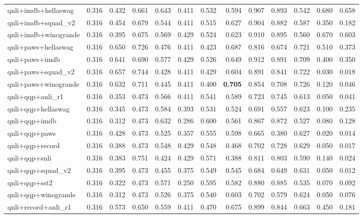 \begin{table}[t]
\begin{tabular}{lrrrrrrrrrrrr}
    qnli+imdb+hellaswag & 0.316 & 0.432 & 0.661 & 0.643 & 0.411 & 0.532 & 0.594 & 0.907 & 0.893 & 0.542 & 0.680 & 0.658 \\
    qnli+imdb+squad\_v2 & 0.316 & 0.454 & 0.679 & 0.544 & 0.411 & 0.515 & 0.627 & 0.904 & 0.882 & 0.587 & 0.350 & 0.182 \\
    qnli+imdb+winogrande & 0.316 & 0.395 & 0.675 & 0.569 & 0.429 & 0.524 & 0.623 & 0.910 & 0.895 & 0.560 & 0.670 & 0.603 \\
    qnli+paws+hellaswag & 0.316 & 0.650 & 0.726 & 0.476 & 0.411 & 0.423 & 0.687 & 0.816 & 0.674 & 0.721 & 0.510 & 0.373 \\
    qnli+paws+imdb & 0.316 & 0.641 & 0.690 & 0.577 & 0.429 & 0.526 & 0.649 & 0.912 & 0.891 & 0.709 & 0.400 & 0.350 \\
    qnli+paws+squad\_v2 & 0.316 & 0.657 & 0.744 & 0.428 & 0.411 & 0.429 & 0.604 & 0.891 & 0.841 & 0.722 & 0.030 & 0.018 \\
    qnli+paws+winogrande & 0.316 & 0.632 & 0.711 & 0.445 & 0.411 & 0.400 & \textbf{0.705} & 0.854 & 0.708 & 0.726 & 0.120 & 0.046 \\
    qnli+qqp+anli\_r1 & 0.316 & 0.353 & 0.473 & 0.566 & 0.411 & 0.541 & 0.589 & 0.723 & 0.745 & 0.613 & 0.050 & 0.041 \\
    qnli+qqp+hellaswag & 0.316 & 0.345 & 0.473 & 0.584 & 0.393 & 0.531 & 0.524 & 0.691 & 0.557 & 0.623 & 0.100 & 0.235 \\
    qnli+qqp+imdb & 0.316 & 0.312 & 0.473 & 0.632 & 0.286 & 0.600 & 0.561 & 0.867 & 0.872 & 0.527 & 0.080 & 0.128 \\
    qnli+qqp+paws & 0.316 & 0.428 & 0.473 & 0.525 & 0.357 & 0.555 & 0.598 & 0.665 & 0.380 & 0.627 & 0.020 & 0.014 \\
    qnli+qqp+record & 0.316 & 0.388 & 0.473 & 0.548 & 0.429 & 0.548 & 0.468 & 0.702 & 0.728 & 0.629 & 0.050 & 0.017 \\
    qnli+qqp+snli & 0.316 & 0.383 & 0.751 & 0.424 & 0.429 & 0.571 & 0.388 & 0.811 & 0.803 & 0.590 & 0.140 & 0.024 \\
    qnli+qqp+squad\_v2 & 0.316 & 0.395 & 0.473 & 0.455 & 0.375 & 0.549 & 0.545 & 0.684 & 0.649 & 0.631 & 0.050 & 0.012 \\
    qnli+qqp+sst2 & 0.316 & 0.322 & 0.473 & 0.571 & 0.250 & 0.595 & 0.582 & 0.880 & 0.885 & 0.535 & 0.070 & 0.092 \\
    qnli+qqp+winogrande & 0.316 & 0.312 & 0.473 & 0.526 & 0.375 & 0.540 & 0.603 & 0.702 & 0.579 & 0.624 & 0.050 & 0.076 \\
    qnli+record+anli\_r1 & 0.316 & 0.573 & 0.650 & 0.559 & 0.411 & 0.470 & 0.675 & 0.899 & 0.844 & 0.663 & 0.450 & 0.181 \\

\end{tabular}
\end{table}
